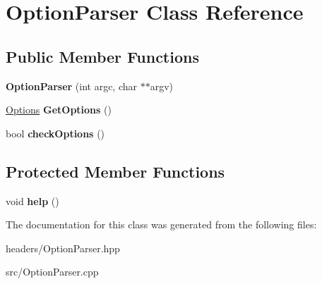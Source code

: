 \hypertarget{classOptionParser}{\section{Option\-Parser Class Reference}
\label{classOptionParser}
}
\subsection*{Public Member Functions}
\begin{DoxyCompactItemize}
\item 
\hypertarget{classOptionParser_ad4e77fb879939e1be9b0d3db9e3d9c1d}{{\bfseries Option\-Parser} (int argc, char $\ast$$\ast$argv)}\label{classOptionParser_ad4e77fb879939e1be9b0d3db9e3d9c1d}

\item 
\hypertarget{classOptionParser_aaf8c1744ffbeabf4d6cd8cf2b7aced3c}{\hyperlink{structOptions}{Options} {\bfseries Get\-Options} ()}\label{classOptionParser_aaf8c1744ffbeabf4d6cd8cf2b7aced3c}

\item 
\hypertarget{classOptionParser_a97c8596b8d61a343946646d0cda304d3}{bool {\bfseries check\-Options} ()}\label{classOptionParser_a97c8596b8d61a343946646d0cda304d3}

\end{DoxyCompactItemize}
\subsection*{Protected Member Functions}
\begin{DoxyCompactItemize}
\item 
\hypertarget{classOptionParser_a0aa28808c4158c44b280023a5b310448}{void {\bfseries help} ()}\label{classOptionParser_a0aa28808c4158c44b280023a5b310448}

\end{DoxyCompactItemize}


The documentation for this class was generated from the following files\-:\begin{DoxyCompactItemize}
\item 
headers/Option\-Parser.\-hpp\item 
src/Option\-Parser.\-cpp\end{DoxyCompactItemize}
